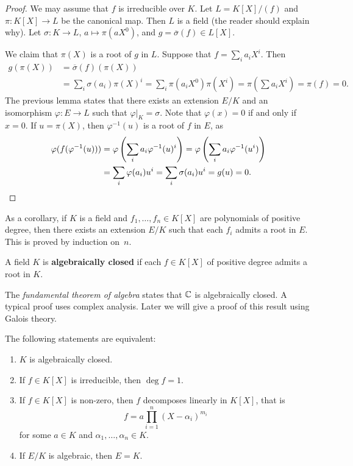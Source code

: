 \begin{proof}
	We may assume that $f$ is irreducible over $K$. Let $L=K[X]/(f)$ and 
	$\pi\colon K[X]\to L$ be the canonical map. Then $L$ 
	is a field (the reader should explain why). 
	Let $\sigma\colon K\to L$, $a\mapsto \pi(aX^0)$, and 
	$g=\overline{\sigma}(f)\in L[X]$. 

	We claim that $\pi(X)$ is a root of $g$ in $L$. Suppose that $f=\sum_i a_iX^i$. 
	Then 
	\begin{align*}
		g(\pi(X))&=\overline{\sigma}(f)(\pi(X))\\
		&=\sum_i \sigma(a_i)\pi(X)^i
		=\sum_i\pi(a_iX^0)\pi(X^i)=\pi(\sum a_iX^i)=\pi(f)=0.
	\end{align*}
	The previous lemma states that 
	there exists an extension $E/K$ and an isomorphism $\varphi\colon E\to L$
	such that $\varphi|_K=\sigma$. Note that
	$\varphi(x)=0$ if and only if $x=0$. If $u=\pi(X)$, then $\varphi^{-1}(u)$ is a root of $f$ in $E$, 
	as 
	\begin{align*}
		\varphi(f(\varphi^{-1}(u)))&=\varphi\left(\sum_ia_i\varphi^{-1}(u)^i\right)
		=\varphi\left(\sum_ia_i\varphi^{-1}(u^i)\right)\\
		&=\sum_i\varphi(a_i)u^i=\sum_i\sigma(a_i)u^i=g(u)=0.\qedhere
	\end{align*}
\end{proof}

As a corollary, if $K$ is a field and $f_1,\dots,f_n\in K[X]$ are polynomials 
of positive degree, then there exists an extension $E/K$  such that 
each $f_i$ admits a root in $E$. This is proved by induction on~$n$.  

\begin{definition}
	A field $K$ is \textbf{algebraically closed} if each $f\in K[X]$ 
	of positive degree admits a root in $K$. 
\end{definition}

The \emph{fundamental theorem of algebra} states that $\mathbb{C}$ is algebraically closed. A
typical proof uses complex analysis.  Later we will give a proof of this result
using Galois theory. 

\begin{proposition}
	The following statements are equivalent:
	\begin{enumerate}
		\item $K$ is algebraically closed.
		\item If $f\in K[X]$ is irreducible, then $\deg f=1$.
		\item If $f\in K[X]$ is non-zero, then $f$ decomposes linearly in $K[X]$, that is
			\[
				f=a\prod_{i=1}^n(X-\alpha_i)^{m_i}
			\]
			for some $a\in K$ and $\alpha_1,\dots,\alpha_n\in K$. 
		\item If $E/K$ is algebraic, then $E=K$. 
	\end{enumerate}
\end{proposition}

